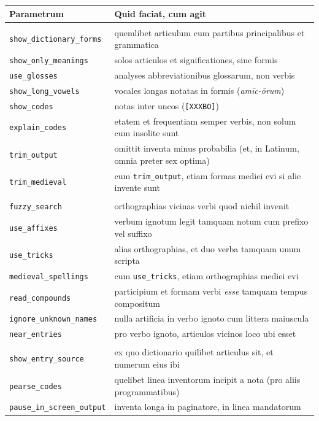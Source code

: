 \documentclass[12pt,
              article,
              oneside
              ]{memoir}
\begin{document}
%
\begin{longtable}{@{}>{\raggedright}p{}p{}@{}}
\toprule
Parametrum & Quid faciat, cum agit\\
\midrule
\endhead
\multicolumn{2}{@{}l}{\itshape Quid inventa ostendant}\\
\texttt{show\_dictionary\_forms} & quemlibet articulum cum partibus principalibus et grammatica\\
\texttt{show\_only\_meanings} & solos articulos et significationes, sine formis\\
\texttt{use\_glosses} & analyses abbreviationibus glossarum, non verbis\\
\texttt{show\_long\_vowels} & vocales longas notatas in formis (\textit{amīc-ōrum})\\
\texttt{show\_codes} & notas inter uncos (\texttt{[XXXBO]})\\
\texttt{explain\_codes} & etatem et frequentiam semper verbis, non solum cum insolite sunt\\
\texttt{trim\_output} & omittit inventa minus probabilia (et, in Latinum, omnia preter sex optima)\\
\texttt{trim\_medieval} & cum \texttt{trim\_output}, etiam formas mediei evi si alie invente sunt\\
\addlinespace
\multicolumn{2}{@{}l}{\itshape Quomodo verba querantur}\\
\texttt{fuzzy\_search} & orthographias vicinas verbi quod nichil invenit\\
\texttt{use\_affixes} & verbum ignotum legit tamquam notum cum prefixo vel suffixo\\
\texttt{use\_tricks} & alias orthographias, et duo verba tamquam unum scripta\\
\texttt{medieval\_spellings} & cum \texttt{use\_tricks}, etiam orthographias mediei evi\\
\texttt{read\_compounds} & participium et formam verbi \textit{esse} tamquam tempus compositum\\
\texttt{ignore\_unknown\_names} & nulla artificia in verbo ignoto cum littera maiuscula\\
\texttt{near\_entries} & pro verbo ignoto, articulos vicinos loco ubi esset\\
\addlinespace
\multicolumn{2}{@{}l}{\itshape Modi elaboratoris}\\
\texttt{show\_entry\_source} & ex quo dictionario quilibet articulus sit, et numerum eius ibi\\
\texttt{pearse\_codes} & quelibet linea inventorum incipit a nota (pro aliis programmatibus)\\
\texttt{pause\_in\_screen\_output} & inventa longa in paginatore, in linea mandatorum\\
\bottomrule
\end{longtable}
\end{document}
